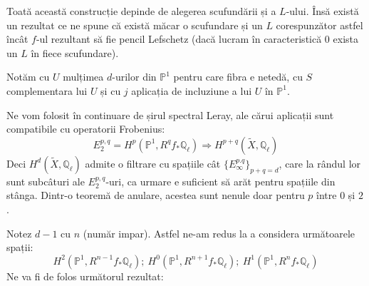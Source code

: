 \documentclass[13pt,openany]{book}
\begin{document}
Toată această construcție depinde de alegerea scufundării și a $L$-ului. Însă există un rezultat ce ne spune că există măcar o scufundare și un $L$ corespunzător astfel încât $f$-ul rezultant să fie pencil Lefschetz (dacă lucram în caracteristică $0$ exista un $L$ în fiece scufundare).

Notăm cu $U$ mulțimea $d$-urilor din $\mathbb{P}^1$ pentru care fibra e netedă, cu $S$ complementara lui $U$ și cu $j$ aplicația de incluziune a lui $U$ în $\mathbb{P}^1$.

Ne vom folosit în continuare de șirul spectral Leray, ale cărui aplicații sunt compatibile cu operatorii Frobenius:
$$E_2^{p,q}=H^p(\mathbb{P}^1,R^q f_* \mathbb{Q}_\ell) \Rightarrow H^{p+q}(\widetilde{X},\mathbb{Q}_\ell)$$
Deci $H^d(\widetilde{X},\mathbb{Q}_\ell)$ admite o filtrare cu spațiile cât $\{E_\infty^{p.q}\}_{p+q=d}$, care la rândul lor sunt subcâturi ale $E_2^{p,q}$-uri, ca urmare e suficient să arăt pentru spațiile din stânga. Dintr-o teoremă de anulare, acestea sunt nenule doar pentru $p$ între $0$ și $2$.

Notez $d-1$ cu $n$ (număr impar). Astfel ne-am redus la a considera următoarele spații:
$$H^2(\mathbb{P}^1,R^{n-1} f_* \mathbb{Q}_\ell);\ H^0(\mathbb{P}^1,R^{n+1} f_* \mathbb{Q}_\ell);\ H^1(\mathbb{P}^1,R^n f_* \mathbb{Q}_\ell)$$
Ne va fi de folos următorul rezultat:
\end{document}
